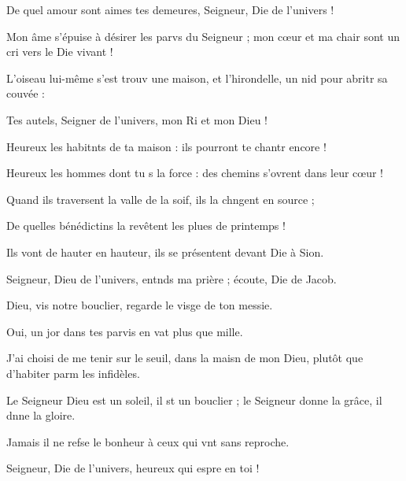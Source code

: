 \item De quel amour sont aimes tes demeures, Seigneur, Die de l’univers !
\item Mon âme s’épuise à désirer les parvs du Seigneur ; mon cœur et ma chair sont un cri vers le Die vivant !
\item L’oiseau lui-même s’est trouv une maison, et l’hirondelle, un nid pour abritr sa couvée : 
\item Tes autels, Seigner de l’univers, mon Ri et mon Dieu !
\item Heureux les habitnts de ta maison : ils pourront te chantr encore !
\item Heureux les hommes dont tu s la force : des chemins s’ovrent dans leur cœur !
\item Quand ils traversent la valle de la soif, ils la chngent en source ;
\item De quelles bénédictins la revêtent les plues de printemps !
\item Ils vont de hauter en hauteur, ils se présentent devant Die à Sion.
\item Seigneur, Dieu de l’univers, entnds ma prière ; écoute, Die de Jacob.
\item Dieu, vis notre bouclier, regarde le visge de ton messie.
\item Oui, un jor dans tes parvis en vat plus que mille. 
\item J’ai choisi de me tenir sur le seuil, dans la maisn de mon Dieu, plutôt que d’habiter parm les infidèles.
\item Le Seigneur Dieu est un soleil, il st un bouclier ; le Seigneur donne la grâce, il dnne la gloire.
\item Jamais il ne refse le bonheur à ceux qui vnt sans reproche.
\item Seigneur, Die de l’univers, heureux qui espre en toi !